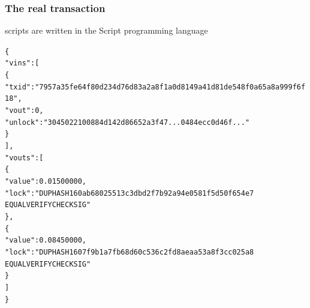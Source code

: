 \documentclass[11pt]{beamer}  %
\begin{document}
\begin{frame}[fragile]\frametitle{The real transaction}

  \begin{center}
    scripts are written in the Script programming language
  \end{center}

  {\scriptsize\begin{alltt}
\{
  "vins": [
    \{
      "txid": "7957a35fe64f80d234d76d83a2a8f1a0d8149a41d81de548f0a65a8a999f6f18",
      "vout": 0,
      "unlock": \alert{"3045022100884d142d86652a3f47... 0484ecc0d46f..."}
    \}
  ],
  "vouts": [
    \{
      "value": 0.01500000,
      "lock": \alert{"DUP HASH160 ab68025513c3dbd2f7b92a94e0581f5d50f654e7
               EQUALVERIFY CHECKSIG"}
    \},
    \{
      "value": 0.08450000,
      "lock": \alert{"DUP HASH160 7f9b1a7fb68d60c536c2fd8aeaa53a8f3cc025a8
               EQUALVERIFY CHECKSIG"}
    \}
  ]
\}
\end{alltt}}

\end{frame}
\end{document}
